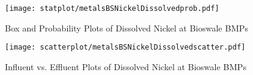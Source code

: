         \begin{figure}[hb]   %
            \centering
            \texttt{[image: statplot/metalsBSNickelDissolvedprob.pdf]}
            \caption{Box and Probability Plots of Dissolved Nickel at Bioswale BMPs}
        \end{figure}         %
        
        
        \begin{figure}[hb]   %
            \centering
            \texttt{[image: scatterplot/metalsBSNickelDissolvedscatter.pdf]}
            \caption{Influent vs. Effluent Plots of Dissolved Nickel at Bioswale BMPs}
        \end{figure}         %
        \clearpage
        